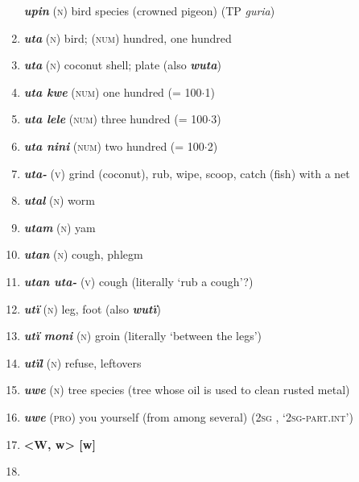 \begin{enumerate}[noitemsep, label={}, align=left, widest=190, labelsep=1ex,leftmargin=*,itemindent=-10pt]
\textbf{\textit{upin}} (\textsc{n}) bird species (crowned pigeon) (TP \textit{guria}) \item 
\textbf{\textit{uta}} (\textsc{n}) bird; (\textsc{num}) hundred, one hundred \item 
\textbf{\textit{uta}} (\textsc{n}) coconut shell; plate (also \textbf{\textit{wuta}}) \item 
\textbf{\textit{uta kwe}} (\textsc{num}) one hundred (= 100${\cdot}$1) \item 
\textbf{\textit{uta lele}} (\textsc{num}) three hundred (= 100${\cdot}$3) \item 
\textbf{\textit{uta nini}} (\textsc{num}) two hundred (= 100${\cdot}$2) \item 
\textbf{\textit{uta-}} (\textsc{v}) grind (coconut), rub, wipe, scoop, catch (fish) with a net \item 
\textbf{\textit{utal}} (\textsc{n}) worm \item 
\textbf{\textit{utam}} (\textsc{n}) yam \item 
\textbf{\textit{utan}} (\textsc{n}) cough, phlegm \item 
\textbf{\textit{utan uta-}} (\textsc{v}) cough (literally ‘rub a cough’?) \item 
\textbf{\textit{utï}} (\textsc{n}) leg, foot (also \textbf{\textit{wutï}}) \item 
\textbf{\textit{utï moni}} (\textsc{n}) groin (literally ‘between the legs’) \item 
\textbf{\textit{utïl}} (\textsc{n}) refuse, leftovers \item 
\textbf{\textit{uwe}} (\textsc{n}) tree species (tree whose oil is used to clean rusted metal) \item 
\largerpage
\textbf{\textit{uwe}} (\textsc{pro}) you yourself (from among several) (2\textsc{sg} , ‘\textsc{2sg-part.int}’)\\ \item 

\noindent\textbf {<W, w>      [w]}\\ \item 


\end{enumerate}

